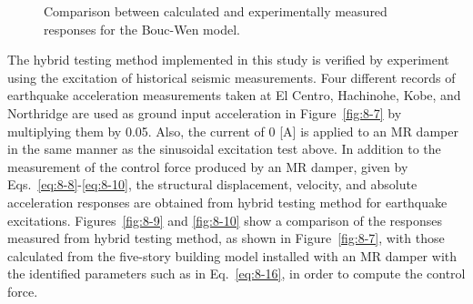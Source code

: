 \begin{figure}[H]
\centering
{}
\caption{Comparison between calculated and experimentally measured responses for the Bouc-Wen model.}
\label{fig:8-8}
\end{figure}

The hybrid testing method implemented in this study is verified by experiment using the excitation of historical seismic measurements. Four different records of earthquake acceleration measurements taken at El Centro, Hachinohe, Kobe, and Northridge are used as ground input acceleration in Figure~\ref{fig:8-7} by multiplying them by 0.05. Also, the current of 0 [A] is applied to an MR damper in the same manner as the sinusoidal excitation test above. In addition to the measurement of the control force produced by an MR damper, given by Eqs.~\eqref{eq:8-8}-\eqref{eq:8-10}, the structural displacement, velocity, and absolute acceleration responses are obtained from hybrid testing method for earthquake excitations. Figures~\ref{fig:8-9} and \ref{fig:8-10} show a comparison of the responses measured from hybrid testing method, as shown in Figure~\ref{fig:8-7}, with those calculated from the five-story building model installed with an MR damper with the identified parameters such as in Eq.~\eqref{eq:8-16}, in order to compute the control force. 


